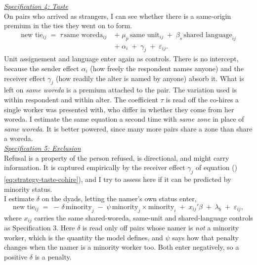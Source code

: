 \noindent \underline{\textit{Specification 4: Taste}} \\[0.4em]
On pairs who arrived as strangers, I can see whether there is a same-origin premium in the ties they went on to form. 
\begin{equation}
\label{eq:strategy-taste-cohire}
\begin{split}
\text{new tie}_{ij} \;=\; \tau\,\text{same woreda}_{ij} \;&+\; \mu_p\,\text{same unit}_{ij} \;+\; \beta_s\,\text{shared language}_{ij} \\
&+\; \alpha_i \;+\; \gamma_j \;+\; \varepsilon_{ij}.
\end{split}
\end{equation}
\noindent Unit assignement and language enter again as controls. There is no intercept, because the sender effect $\alpha_i$ (how freely the respondent names anyone) and the receiver effect $\gamma_j$ (how readily the alter is named by anyone) absorb it. What is left on \textit{same woreda} is a premium attached to the pair. The variation used is within respondent and within alter. The coefficient $\tau$ is read off the co-hires a single worker was presented with, who differ in whether they come from her woreda. I estimate the same equation a second time with \textit{same zone} in place of \textit{same woreda}. It is better powered, since many more pairs share a zone than share a woreda.  \\

\noindent \underline{\textit{Specification 5: Exclusion}} \\[0.4em]
Refusal is a property of the person refused, is directional, and might carry information. It is captured empirically by the receiver effect ${\gamma}_j$ of equation ()\ref{eq:strategy-taste-cohire}), and I try to assess here if it can be predicted by minority status. \\

\noindent I estimate $\delta$ on the dyads, letting the namer's own status enter,
\begin{equation}
\label{eq:strategy-excl-split}
\text{new tie}_{ij} \;=\; -\,\delta\,\text{minority}_j \;-\; \psi\,\text{minority}_j \times \text{minority}_i \;+\; x_{ij}'\beta \;+\; \lambda_b \;+\; \varepsilon_{ij},
\end{equation}
where $x_{ij}$ carries the same shared-woreda, same-unit and shared-language controls as Specification 3. Here $\delta$ is read only off pairs whose namer is \textit{not} a minority worker, which is the quantity the model defines, and $\psi$ says how that penalty changes when the namer is a minority worker too. Both enter negatively, so a positive $\delta$ is a penalty. \\

